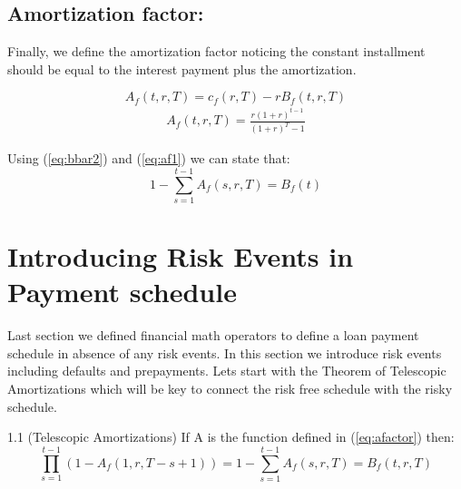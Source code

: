 \subsection{Amortization factor:}
Finally, we define the amortization factor noticing the constant installment should be equal to the interest payment plus the amortization.

\begin{equation}
    A_f(t,r,T) = c_f(r,T)-rB_f(t,r,T) \label{eq:af1}
\end{equation}
\begin{align}
    \boxed{A_f(t,r,T)=\frac{r(1+r)^{t-1}}{(1+r)^T-1}} \label{eq:afactor}
\end{align}
\begin{corollary}{1}
Using (\ref{eq:bbar2}) and (\ref{eq:af1}) we can state that:
\[
1-\sum_{s=1}^{t-1} A_f(s,r,T)=B_f(t)
\]
\end{corollary} 

\section{Introducing Risk Events in Payment schedule}
Last section we defined financial math operators to define a loan payment schedule in absence of any risk events. In this section we introduce risk events including defaults and prepayments. Lets start with the Theorem of Telescopic Amortizations which will be key to connect the risk free schedule with the risky schedule.
\begin{theorem}{1.1 (Telescopic Amortizations)}{} \label{teo:1}
If A is the function defined in (\ref{eq:afactor}) then:
\[
\prod^{t-1}_{s=1}(1-A_f(1,r,T-s+1))=1-\sum^{t-1}_{s=1}A_f(s,r,T) =B_f(t,r,T)
\]
\end{theorem}

